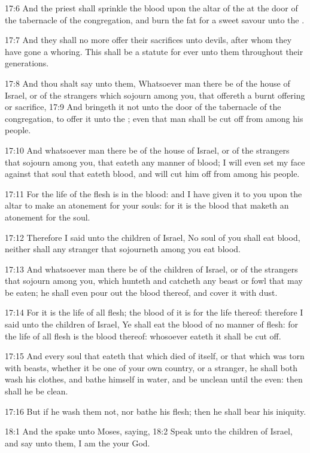 17:6 And the priest shall sprinkle the blood upon the altar of the \LORD at the door of the tabernacle of the congregation, and burn the fat for a sweet savour unto the \LORD.

17:7 And they shall no more offer their sacrifices unto devils, after whom they have gone a whoring. This shall be a statute for ever unto them throughout their generations.

17:8 And thou shalt say unto them, Whatsoever man there be of the house of Israel, or of the strangers which sojourn among you, that offereth a burnt offering or sacrifice, 17:9 And bringeth it not unto the door of the tabernacle of the congregation, to offer it unto the \LORD; even that man shall be cut off from among his people.

17:10 And whatsoever man there be of the house of Israel, or of the strangers that sojourn among you, that eateth any manner of blood; I will even set my face against that soul that eateth blood, and will cut him off from among his people.

17:11 For the life of the flesh is in the blood: and I have given it to you upon the altar to make an atonement for your souls: for it is the blood that maketh an atonement for the soul.

17:12 Therefore I said unto the children of Israel, No soul of you shall eat blood, neither shall any stranger that sojourneth among you eat blood.

17:13 And whatsoever man there be of the children of Israel, or of the strangers that sojourn among you, which hunteth and catcheth any beast or fowl that may be eaten; he shall even pour out the blood thereof, and cover it with dust.

17:14 For it is the life of all flesh; the blood of it is for the life thereof: therefore I said unto the children of Israel, Ye shall eat the blood of no manner of flesh: for the life of all flesh is the blood thereof: whosoever eateth it shall be cut off.

17:15 And every soul that eateth that which died of itself, or that which was torn with beasts, whether it be one of your own country, or a stranger, he shall both wash his clothes, and bathe himself in water, and be unclean until the even: then shall he be clean.

17:16 But if he wash them not, nor bathe his flesh; then he shall bear his iniquity.

18:1 And the \LORD spake unto Moses, saying, 18:2 Speak unto the children of Israel, and say unto them, I am the \LORD your God.

